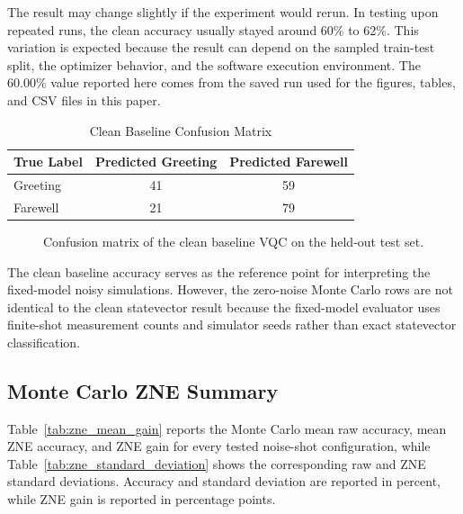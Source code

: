 \documentclass[conference]{IEEEtran}
\begin{document}
The result may change slightly if the experiment would rerun. In testing upon repeated runs,
the clean accuracy usually stayed around 60\% to 62\%. This variation is expected
because the result can depend on the sampled train-test split, the optimizer
behavior, and the software execution environment. The 60.00\% value reported here
comes from the saved run used for the figures, tables, and CSV files in this
paper.

\begin{table}[t]
\caption{Clean Baseline Confusion Matrix}
\label{tab:clean_confusion_matrix}
\centering
\renewcommand{\arraystretch}{1.15}
\begin{tabular}{|l|c|c|}
\hline
\textbf{True Label} & \textbf{Predicted Greeting} & \textbf{Predicted Farewell} \\
\hline
Greeting & 41 & 59 \\
\hline
Farewell & 21 & 79 \\
\hline
\end{tabular}
\end{table}

\begin{figure}[H]
\centering

\caption{Confusion matrix of the clean baseline VQC on the held-out test set.}
\label{fig:clean_confusion_matrix}
\end{figure}

The clean baseline accuracy serves as the reference point for interpreting the
fixed-model noisy simulations. However, the zero-noise Monte Carlo rows are not
identical to the clean statevector result because the fixed-model evaluator uses
finite-shot measurement counts and simulator seeds rather than exact statevector
classification.

\subsection{Monte Carlo ZNE Summary}

Table~\ref{tab:zne_mean_gain} reports the Monte Carlo mean raw
accuracy, mean ZNE accuracy, and ZNE gain for every tested noise-shot
configuration, while Table~\ref{tab:zne_standard_deviation} shows the
corresponding raw and ZNE standard deviations. Accuracy and standard deviation
are reported in percent, while ZNE gain is reported in percentage points.
\end{document}

